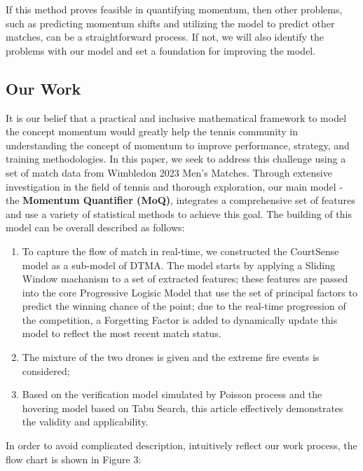 \documentclass[12pt]{article}  %
\begin{document}
If this method proves feasible in quantifying momentum, then other problems, such as predicting momentum shifts and utilizing the model to predict other matches, can be a straightforward process. If not, we will also identify the problems with our model and set a foundation for improving the model.

\subsection{Our Work}
It is our belief that a practical and inclusive mathematical framework to model the concept momentum would greatly help the tennis community in understanding the concept of momentum to improve performance, strategy, and training methodologies. In this paper, we seek to address this challenge using a set of match data from Wimbledon 2023 Men's Matches. Through extensive investigation in the field of tennis and thorough exploration, our main model - the \textbf{Momentum Quantifier (MoQ)}, integrates a comprehensive set of features and use a variety of statistical methods to achieve this goal. The building of this model can be overall described as follows:
\begin{enumerate}[\bfseries (1)]
	\setlength{\parsep}{0ex} %
	\setlength{\topsep}{2ex} %
	\setlength{\itemsep}{1ex} %
	\item To capture the flow of match in real-time, we constructed the CourtSense model as a sub-model of DTMA. The model starts by applying a Sliding Window machanism to a set of extracted features; these features are passed into the core Progressive Logisic Model that use the set of principal factors to predict the winning chance of the point; due to the real-time progression of the competition, a Forgetting Factor is added to dynamically update this model to reflect the most recent match status. 
	\item The mixture of the two drones is given and the extreme fire events is considered;
	\item Based on the verification model simulated by Poisson process and the hovering model based on Tabu Search, this article effectively demonstrates the validity and applicability.
\end{enumerate}
In order to avoid complicated description, intuitively reflect our work process, the flow chart is shown in Figure 3:
\end{document}
